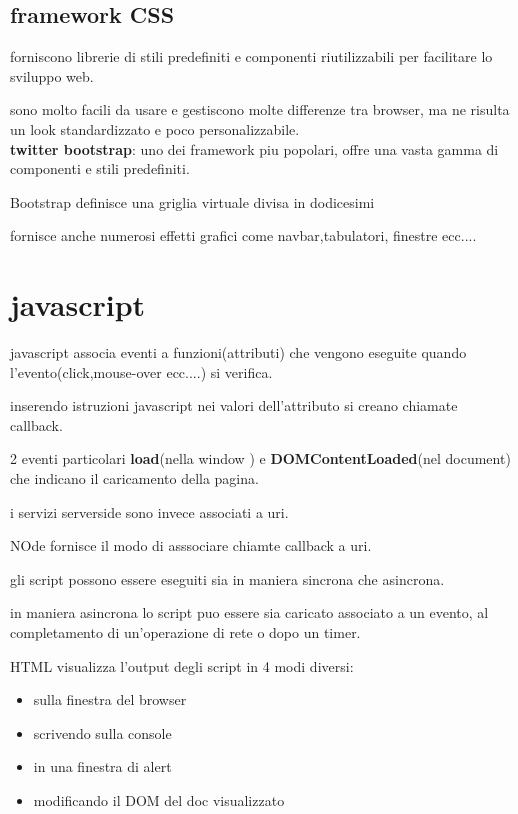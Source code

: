 \documentclass[12pt]{article}
\begin{document}
\subsection{framework CSS}

forniscono librerie di stili predefiniti e componenti riutilizzabili per facilitare lo sviluppo web.

sono molto facili da usare e gestiscono molte differenze tra browser, ma ne risulta un look standardizzato e poco personalizzabile.\\

\textbf{twitter bootstrap}: uno dei framework piu popolari, offre una vasta gamma di componenti e stili predefiniti.

Bootstrap definisce una griglia virtuale divisa in dodicesimi

fornisce anche numerosi effetti grafici come navbar,tabulatori, finestre ecc....

\section{javascript}

javascript associa eventi a funzioni(attributi) che vengono eseguite quando l'evento(click,mouse-over ecc....)
 si verifica.

 inserendo istruzioni javascript nei valori dell'attributo si creano chiamate callback.

 2 eventi particolari \textbf{load}(nella window ) e \textbf{DOMContentLoaded}(nel document) che indicano il caricamento della pagina.

 i servizi serverside sono invece associati a uri.

 NOde fornisce il modo di asssociare chiamte callback a uri.

gli script possono essere eseguiti sia in maniera sincrona che asincrona.

in maniera asincrona lo script puo essere sia caricato associato a un evento, al completamento di un'operazione di rete o dopo un timer.

HTML visualizza l'output degli script in 4 modi diversi:
\begin{itemize}
    \item sulla finestra del browser
    \item scrivendo sulla console
    \item in una finestra di alert
    \item modificando il DOM del doc visualizzato
    \end{itemize} 
\end{document}
